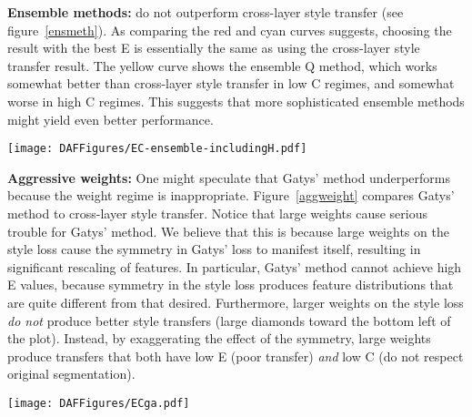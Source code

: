 \documentclass[runningheads]{llncs}
\begin{document}
{\bf Ensemble methods:} do not outperform cross-layer style transfer (see figure~\ref{ensmeth}).  As comparing the red
and cyan curves suggests, choosing the result with the best E is essentially the same as using the cross-layer style
transfer result.  The yellow curve shows the ensemble Q method, which works somewhat better than cross-layer style
transfer in low C regimes, and somewhat worse in high C regimes.  This suggests that more sophisticated ensemble methods
might yield even better performance.


\begin{figure*}[!htbp]
    \texttt{[image: DAFFigures/EC-ensemble-includingH.pdf]}
\caption{\em An EC plot comparing two ensemble methods to cross-layer additive loss.  
Scale is the same as Figure \protect \ref{ecxvg}.   }
\label{ensmethl}
\end{figure*}

{\bf Aggressive weights:} One might speculate that Gatys' method underperforms because the weight regime is
inappropriate.  Figure~\ref{aggweight} compares Gatys' method to cross-layer style transfer.   Notice
  that large weights cause serious trouble for Gatys' method.  We believe that this is because large weights on the
  style loss cause the symmetry in Gatys' loss to manifest itself, resulting in significant rescaling of features.
In particular, Gatys' method cannot achieve high E values,
because symmetry in the style loss produces feature distributions that are quite different from that desired.
Furthermore, larger weights on the style loss {\em do not} produce better style transfers (large diamonds toward the
  bottom left of the plot).  Instead, by exaggerating the effect of the symmetry, large weights produce transfers that
  both have low E (poor transfer) {\em and} low C (do not respect original segmentation).  


\begin{figure*}[!htbp]
    \texttt{[image: DAFFigures/ECga.pdf]}
\caption{\em An EC plot comparing Gatys' method to cross-layer style transfer for the aggressive weight dataset.  Notice
  that large weights cause serious trouble for Gatys' method (large diamonds clustered in the bottom left corner).
  Cross-layer style transfer outperforms Gatys' method over all of its range, mostly by many standard errors.
Scale is the same as Figure \protect \ref{ecxvg}.   }
\label{aggweight}
\end{figure*}
\end{document}
